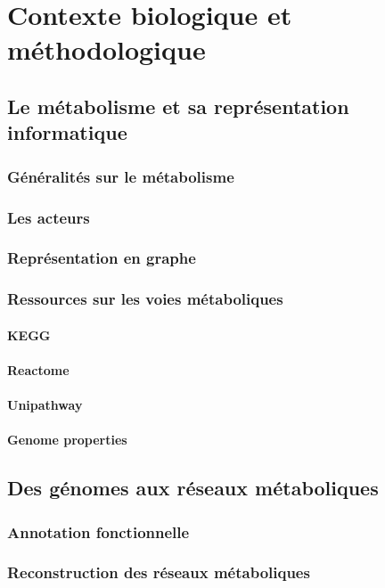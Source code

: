 \chapter{Contexte biologique et méthodologique }

\section{Le métabolisme et sa représentation informatique}
\subsection{Généralités sur le métabolisme}
\subsection{Les acteurs}
\subsection{Représentation en graphe}
\subsection{Ressources sur les voies métaboliques}
\subsubsection{KEGG}
\subsubsection{Reactome}
\subsubsection{Unipathway}
\subsubsection{Genome properties}

\section{Des génomes aux réseaux métaboliques}
\subsection{Annotation fonctionnelle}
\subsection{Reconstruction des réseaux métaboliques}
